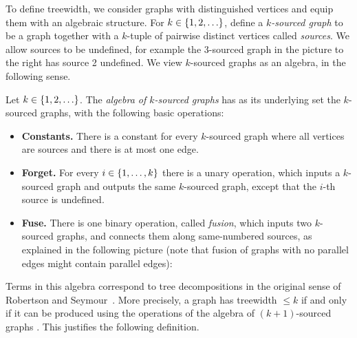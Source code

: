         
        
        \begin{wrapfigure}{r}{0.4\textwidth}
             \end{wrapfigure}  
To define treewidth, we consider graphs with distinguished vertices and equip them with an algebraic structure.  
    For $k \in \{1,2,\ldots\}$,  define a \emph{$k$-sourced graph}
     to be a  graph together with a $k$-tuple of pairwise distinct vertices called \emph{sources}. We allow sources to be undefined, for example the 3-sourced graph in the picture to the right has source 2 undefined. 
    We view  $k$-sourced graphs as an algebra, in the following sense.



    
    \begin{definition}
         Let $k \in \{1,2,\ldots\}$. The \emph{algebra of $k$-sourced graphs} has as its underlying set the  $k$-sourced graphs,  with the following basic operations:
            \begin{itemize}
                \item {\bf Constants.} There is a constant for every $k$-sourced graph where all vertices are sources and there is at most one edge.
                \item {\bf Forget.} For every $i \in \{1,\ldots,k\}$ there is a unary operation, which inputs a $k$-sourced graph and outputs the same $k$-sourced graph, except that the $i$-th source is undefined. 
                \item {\bf Fuse.} There is one binary operation, called \emph{fusion}, which inputs two $k$-sourced graphs, and 
                connects %
                them along same-numbered sources, 
                as explained in the following picture (note that fusion of graphs with no parallel edges might contain parallel edges):
            \end{itemize}
        \end{definition}
    
        Terms in this algebra correspond to tree decompositions in the original sense of Robertson and Seymour~\cite[Section 12.3]{diestel}. More precisely, a graph has treewidth $\leq k$  if and only if it can be produced using the operations of the algebra of $(k+1)$-sourced graphs \cite[Proposition 4.1]{courcelleEtAlAlgebraicTheoryOfGraphReduction93}. This justifies the following definition.



